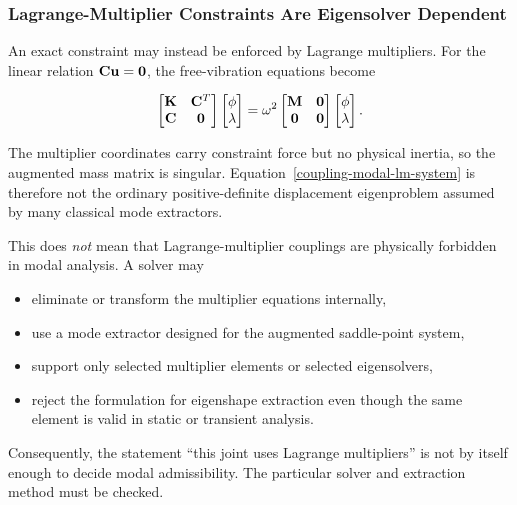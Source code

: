 \subsubsection{Lagrange-Multiplier Constraints Are Eigensolver Dependent}

An exact constraint may instead be enforced by Lagrange multipliers. For the
linear relation $\mathbf{C}\mathbf{u}=\mathbf{0}$, the free-vibration equations become

\begin{equation}\label{coupling-modal-lm-system}
\begin{bmatrix}
    \mathbf{K} & \mathbf{C}^{T}\\
    \mathbf{C} & \mathbf{0}
\end{bmatrix}
\begin{bmatrix}
    \mathbf{\phi}\\
    \mathbf{\lambda}
\end{bmatrix}
=\omega^2
\begin{bmatrix}
    \mathbf{M} & \mathbf{0}\\
    \mathbf{0} & \mathbf{0}
\end{bmatrix}
\begin{bmatrix}
    \mathbf{\phi}\\
    \mathbf{\lambda}
\end{bmatrix}.
\end{equation}

The multiplier coordinates carry constraint force but no physical inertia, so
the augmented mass matrix is singular. Equation~\eqref{coupling-modal-lm-system}
is therefore not the ordinary positive-definite displacement eigenproblem
assumed by many classical mode extractors.

This does \emph{not} mean that Lagrange-multiplier couplings are physically
forbidden in modal analysis. A solver may

\begin{itemize}
    \item eliminate or transform the multiplier equations internally,
    \item use a mode extractor designed for the augmented saddle-point system,
    \item support only selected multiplier elements or selected eigensolvers,
    \item reject the formulation for eigenshape extraction even though the same
          element is valid in static or transient analysis.
\end{itemize}

Consequently, the statement ``this joint uses Lagrange multipliers'' is not by
itself enough to decide modal admissibility. The particular solver and extraction
method must be checked.

